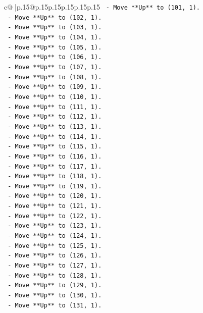 \documentclass{article}
\begin{document}
{\begin{supertabular}{c@{$\;$}|p{.15\linewidth}@{}p{.15\linewidth}p{.15\linewidth}p{.15\linewidth}p{.15\linewidth}p{.15\linewidth}}
{{{\texttt{    {-} Move **Up** to (101, 1).} \\
\texttt{    {-} Move **Up** to (102, 1).} \\
\texttt{    {-} Move **Up** to (103, 1).} \\
\texttt{    {-} Move **Up** to (104, 1).} \\
\texttt{    {-} Move **Up** to (105, 1).} \\
\texttt{    {-} Move **Up** to (106, 1).} \\
\texttt{    {-} Move **Up** to (107, 1).} \\
\texttt{    {-} Move **Up** to (108, 1).} \\
\texttt{    {-} Move **Up** to (109, 1).} \\
\texttt{    {-} Move **Up** to (110, 1).} \\
\texttt{    {-} Move **Up** to (111, 1).} \\
\texttt{    {-} Move **Up** to (112, 1).} \\
\texttt{    {-} Move **Up** to (113, 1).} \\
\texttt{    {-} Move **Up** to (114, 1).} \\
\texttt{    {-} Move **Up** to (115, 1).} \\
\texttt{    {-} Move **Up** to (116, 1).} \\
\texttt{    {-} Move **Up** to (117, 1).} \\
\texttt{    {-} Move **Up** to (118, 1).} \\
\texttt{    {-} Move **Up** to (119, 1).} \\
\texttt{    {-} Move **Up** to (120, 1).} \\
\texttt{    {-} Move **Up** to (121, 1).} \\
\texttt{    {-} Move **Up** to (122, 1).} \\
\texttt{    {-} Move **Up** to (123, 1).} \\
\texttt{    {-} Move **Up** to (124, 1).} \\
\texttt{    {-} Move **Up** to (125, 1).} \\
\texttt{    {-} Move **Up** to (126, 1).} \\
\texttt{    {-} Move **Up** to (127, 1).} \\
\texttt{    {-} Move **Up** to (128, 1).} \\
\texttt{    {-} Move **Up** to (129, 1).} \\
\texttt{    {-} Move **Up** to (130, 1).} \\
\texttt{    {-} Move **Up** to (131, 1).} \\
}}}
\end{supertabular}}
\end{document}
